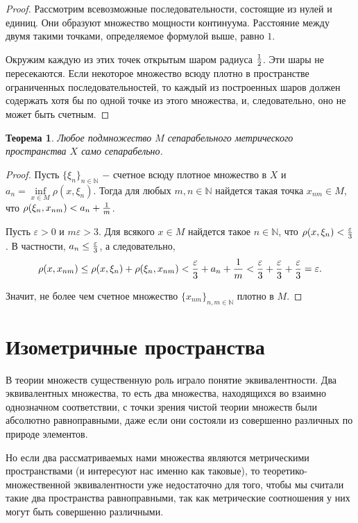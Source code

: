 \documentclass{article}
\newtheorem{theorem}{Теорема}[section]
\begin{document}
\begin{proof}
Рассмотрим всевозможные последовательности, состоящие из нулей и единиц. Они образуют множество мощности континуума. Расстояние между двумя такими точками, определяемое формулой выше, равно \(1\).

Окружим каждую из этих точек открытым шаром радиуса \({1} \over {2}\). Эти шары не пересекаются. Если некоторое множество всюду плотно в пространстве ограниченных последовательностей, то каждый из построенных шаров должен содержать хотя бы по одной точке из этого множества, и, следовательно, оно не может быть счетным.
\end{proof}

\begin{theorem}
Любое подмножество \(M\) сепарабельного метрического пространства \(X\) само сепарабельно.
\end{theorem}

\begin{proof}
Пусть \(\{\xi_n\}_{n \in \mathbb{N}}\) \(-\) счетное всюду плотное множество в \(X\) и \(a_n = \inf\limits_{x \in M} {\rho(x, \xi_n)}\). Тогда для любых \(m, n \in \mathbb{N}\) найдется такая точка \(x_{nm} \in M\), что \(\rho(\xi_n, x_{nm}) < a_n + {1 \over m}\).

Пусть \(\varepsilon > 0\) и \(m\varepsilon > 3\). Для всякого \(x \in M\) найдется такое \(n \in \mathbb{N}\), что \(\rho(x, \xi_n) < {\varepsilon \over 3}\). В частности, \(a_n \leq {\varepsilon \over 3}\), а следовательно,
\[
\rho(x, x_{nm}) \leq \rho(x, \xi_n) + \rho(\xi_n, x_{nm}) < {\varepsilon \over 3} + a_n + {1 \over m} < {\varepsilon \over 3} + {\varepsilon \over 3} + {\varepsilon \over 3} = \varepsilon.
\]

Значит, не более чем счетное множество \(\{x_{nm}\}_{n, m \in \mathbb{N}}\) плотно в \(M\).
\end{proof}

\section{Изометричные пространства}

В теории множеств существенную роль играло понятие эквивалентности. Два эквивалентных множества, то есть два множества, находящихся во взаимно однозначном соответствии, с точки зрения чистой теории множеств были абсолютно равноправными, даже если они состояли из совершенно различных по природе элементов.

Но если два рассматриваемых нами множества являются метрическими пространствами (и интересуют нас именно как таковые), то теоретико-множественной эквивалентности уже недостаточно для того, чтобы мы считали такие два пространства равноправными, так как метрические соотношения у них могут быть совершенно различными.
\end{document}
